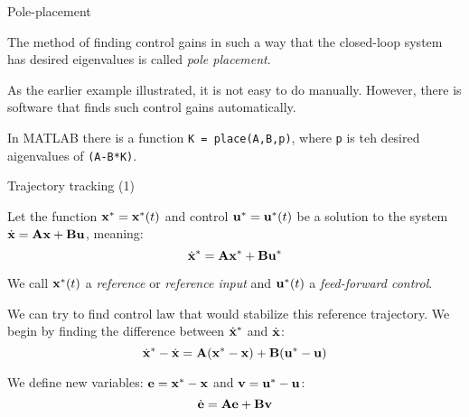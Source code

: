 \documentclass{beamer}
\begin{document}
\begin{frame}{Pole-placement}
	\begin{flushleft}
		
		The method of finding control gains in such a way that the closed-loop system has desired eigenvalues is called \emph{pole placement}.
		
		\bigskip
		
		As the earlier example illustrated, it is not easy to do manually. However, there is software that finds such control gains automatically.
		
		\bigskip
		
		In MATLAB there is a function \texttt{K = place(A,B,p)}, where \texttt{p} is teh desired aigenvalues of \texttt{(A-B*K)}.
		
		
	\end{flushleft}
\end{frame}










\begin{frame}{Trajectory tracking (1)}
	\begin{flushleft}
		
		Let the function $\mathbf{x}^* = \mathbf{x}^*(t)$ and control $\mathbf{u}^* = \mathbf{u}^*(t)$ be a solution to the system $\dot{\mathbf{x}} = \mathbf{A}\mathbf{x} + \mathbf{B}\mathbf{u}$, meaning:
		\begin{equation}
			\dot{\mathbf{x}}^* = \mathbf{A}\mathbf{x}^* + \mathbf{B}\mathbf{u}^*
		\end{equation}
	
		We call $\mathbf{x}^*(t)$ a \emph{reference} or \emph{reference input} and $\mathbf{u}^*(t)$ a \emph{feed-forward control}.
		
		\bigskip
		
		We can try to find control law that would stabilize this reference trajectory. We begin by finding the difference between $\dot{\mathbf{x}}^*$ and $\dot{\mathbf{x}}$:
		\begin{equation}
			\dot{\mathbf{x}}^* - \dot{\mathbf{x}}= \mathbf{A}(\mathbf{x}^*-\mathbf{x}) + \mathbf{B}(\mathbf{u}^*-\mathbf{u})
		\end{equation}
		
		We define new variables: $\mathbf{e} = \mathbf{x}^* - \mathbf{x}$ and $\mathbf{v} = \mathbf{u}^* - \mathbf{u}$:
		\begin{equation}
			\dot{\mathbf{e}} = \mathbf{A}\mathbf{e} + \mathbf{B}\mathbf{v}
		\end{equation}
		
	\end{flushleft}
\end{frame}
\end{document}
